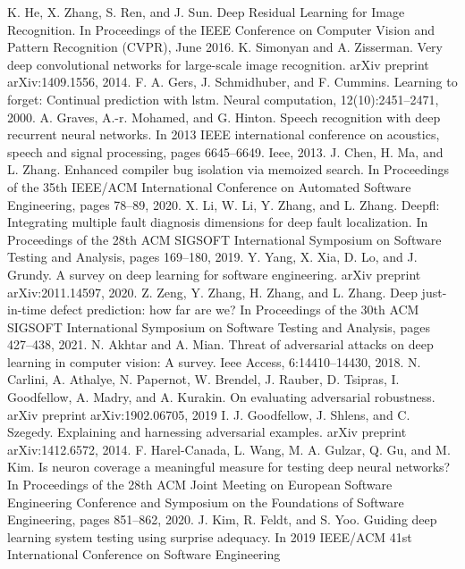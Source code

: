 \documentclass[sigconf]{acmart}
\begin{document}
\begin{thebibliography}{9}
 K. He, X. Zhang, S. Ren, and J. Sun. Deep Residual Learning for Image Recognition.
In Proceedings of the IEEE Conference on Computer Vision and Pattern Recognition
(CVPR), June 2016.
 K. Simonyan and A. Zisserman. Very deep convolutional networks for large-scale
image recognition. arXiv preprint arXiv:1409.1556, 2014.
 F. A. Gers, J. Schmidhuber, and F. Cummins. Learning to forget: Continual
prediction with lstm. Neural computation, 12(10):2451–2471, 2000.
 A. Graves, A.-r. Mohamed, and G. Hinton. Speech recognition with deep recurrent
neural networks. In 2013 IEEE international conference on acoustics, speech and
signal processing, pages 6645–6649. Ieee, 2013.
 J. Chen, H. Ma, and L. Zhang. Enhanced compiler bug isolation via memoized
search. In Proceedings of the 35th IEEE/ACM International Conference on Automated
Software Engineering, pages 78–89, 2020.
 X. Li, W. Li, Y. Zhang, and L. Zhang. Deepfl: Integrating multiple fault diagnosis
dimensions for deep fault localization. In Proceedings of the 28th ACM SIGSOFT
International Symposium on Software Testing and Analysis, pages 169–180, 2019.
 Y. Yang, X. Xia, D. Lo, and J. Grundy. A survey on deep learning for software
engineering. arXiv preprint arXiv:2011.14597, 2020.
 Z. Zeng, Y. Zhang, H. Zhang, and L. Zhang. Deep just-in-time defect prediction:
how far are we? In Proceedings of the 30th ACM SIGSOFT International Symposium
on Software Testing and Analysis, pages 427–438, 2021.
 N. Akhtar and A. Mian. Threat of adversarial attacks on deep learning in computer
vision: A survey. Ieee Access, 6:14410–14430, 2018.
 N. Carlini, A. Athalye, N. Papernot, W. Brendel, J. Rauber, D. Tsipras, I. Goodfellow,
A. Madry, and A. Kurakin. On evaluating adversarial robustness. arXiv preprint
arXiv:1902.06705, 2019
 I. J. Goodfellow, J. Shlens, and C. Szegedy. Explaining and harnessing adversarial
examples. arXiv preprint arXiv:1412.6572, 2014.
 F. Harel-Canada, L. Wang, M. A. Gulzar, Q. Gu, and M. Kim. Is neuron coverage a
meaningful measure for testing deep neural networks? In Proceedings of the 28th
ACM Joint Meeting on European Software Engineering Conference and Symposium
on the Foundations of Software Engineering, pages 851–862, 2020.
 J. Kim, R. Feldt, and S. Yoo. Guiding deep learning system testing using surprise
adequacy. In 2019 IEEE/ACM 41st International Conference on Software Engineering

\end{thebibliography}
\end{document}
